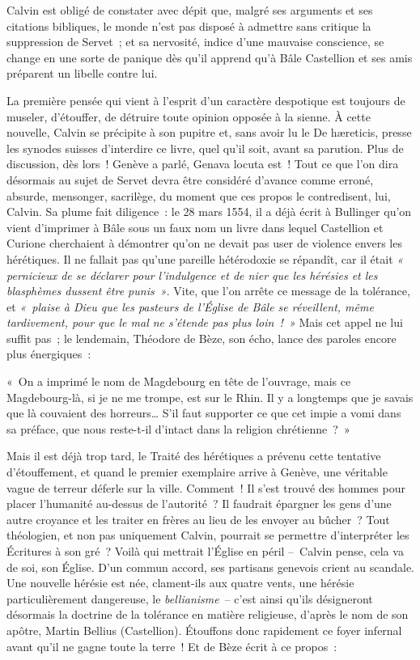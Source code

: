 \documentclass[french,twoside]{book} %
\newenvironment{quoteblock}%
  {\begin{quoting}}
  {\end{quoting}}
\newenvironment{quotebar}{%
    \def\FrameCommand{{\color{rubric!10!}\vrule width 0.5em} \hspace{0.9em}}%
    \def\OuterFrameSep{2pt} %
    \MakeFramed {\advance\hsize-\width \FrameRestore}
  }%
  {%
    \endMakeFramed
  }
\renewenvironment{quoteblock}%
  {%
    \savenotes
    \setstretch{0.9}
    \normalfont
    \begin{quotebar}
  }
  {%
    \end{quotebar}
    \spewnotes
  }
\begin{document}
\noindent Calvin est obligé de constater avec dépit que, malgré ses arguments et ses citations bibliques, le monde n’est pas disposé à admettre sans critique la suppression de Servet ; et sa nervosité, indice d’une mauvaise conscience, se change en une sorte de panique dès qu’il apprend qu’à Bâle Castellion et ses amis préparent un libelle contre lui.\par
La première pensée qui vient à l’esprit d’un caractère despotique est toujours de museler, d’étouffer, de détruire toute opinion opposée à la sienne. À cette nouvelle, Calvin se précipite à son pupitre et, sans avoir lu le De hæreticis, presse les synodes suisses d’interdire ce livre, quel qu’il soit, avant sa parution. Plus de discussion, dès lors ! Genève a parlé, Genava locuta est ! Tout ce que l’on dira désormais au sujet de Servet devra être considéré d’avance comme erroné, absurde, mensonger, sacrilège, du moment que ces propos le contredisent, lui, Calvin. Sa plume fait diligence : le 28 mars 1554, il a déjà écrit à Bullinger qu’on vient d’imprimer à Bâle sous un faux nom un livre dans lequel Castellion et Curione cherchaient à démontrer qu’on ne devait pas user de violence envers les hérétiques. Il ne fallait pas qu’une pareille hétérodoxie se répandît, car il était \emph{« pernicieux de se déclarer pour l’indulgence et de nier que les hérésies et les blasphèmes dussent être punis »}. Vite, que l’on arrête ce message de la tolérance, et \emph{« plaise à Dieu que les pasteurs de l’Église de Bâle se réveillent, même tardivement, pour que le mal ne s’étende pas plus loin ! »} Mais cet appel ne lui suffit pas ; le lendemain, Théodore de Bèze, son écho, lance des paroles encore plus énergiques :\par

\begin{quoteblock}
\noindent « On a imprimé le nom de Magdebourg en tête de l’ouvrage, mais ce Magdebourg-là, si je ne me trompe, est sur le Rhin. Il y a longtemps que je savais que là couvaient des horreurs… S’il faut supporter ce que cet impie a vomi dans sa préface, que nous reste-t-il d’intact dans la religion chrétienne ? »\end{quoteblock}

\noindent Mais il est déjà trop tard, le Traité des hérétiques a prévenu cette tentative d’étouffement, et quand le premier exemplaire arrive à Genève, une véritable vague de terreur déferle sur la ville. Comment ! Il s’est trouvé des hommes pour placer l’humanité au-dessus de l’autorité ? Il faudrait épargner les gens d’une autre croyance et les traiter en frères au lieu de les envoyer au bûcher ? Tout théologien, et non pas uniquement Calvin, pourrait se permettre d’interpréter les Écritures à son gré ? Voilà qui mettrait l’Église en péril – Calvin pense, cela va de soi, son Église. D’un commun accord, ses partisans genevois crient au scandale. Une nouvelle hérésie est née, clament-ils aux quatre vents, une hérésie particulièrement dangereuse, le \emph{bellianisme} – c’est ainsi qu’ils désigneront désormais la doctrine de la tolérance en matière religieuse, d’après le nom de son apôtre, Martin Bellius (Castellion). Étouffons donc rapidement ce foyer infernal avant qu’il ne gagne toute la terre ! Et de Bèze écrit à ce propos :\par
\end{document}
